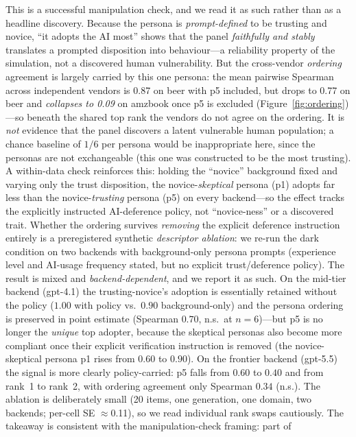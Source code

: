 \documentclass[manuscript,nonacm]{acmart}
\begin{document}
This is a successful manipulation check, and we read it as such rather than as a headline discovery.
Because the persona is \emph{prompt-defined} to be trusting and novice, ``it adopts the AI most'' shows
that the panel \emph{faithfully and stably} translates a prompted disposition into behaviour---a
reliability property of the simulation, not a discovered human vulnerability. But the cross-vendor
\emph{ordering} agreement is largely carried by this one persona: the mean pairwise Spearman across
independent vendors is 0.87 on beer with p5 included, but drops to 0.77 on beer and \emph{collapses to
0.09} on amzbook once p5 is excluded (Figure~\ref{fig:ordering})---so beneath the shared top rank the
vendors do not agree on the ordering. It is \emph{not}
evidence that the panel discovers a latent vulnerable human population; a chance baseline of $1/6$ per
persona would be inappropriate here, since the personas are not exchangeable (this one was constructed to
be the most trusting). A within-data check reinforces this: holding the ``novice'' background fixed and
varying only the trust disposition, the novice-\emph{skeptical} persona (p1) adopts far less than the
novice-\emph{trusting} persona (p5) on every backend---so the effect tracks the explicitly instructed
AI-deference policy, not ``novice-ness'' or a discovered trait. Whether the ordering survives \emph{removing}
the explicit deference instruction entirely is a preregistered synthetic \emph{descriptor ablation}: we
re-run the dark condition on two backends with background-only persona prompts (experience level and
AI-usage frequency stated, but no explicit trust/deference policy). The result is mixed and
\emph{backend-dependent}, and we report it as such. On the mid-tier backend (gpt-4.1) the trusting-novice's
adoption is essentially retained without the policy ($1.00$ with policy vs.\ $0.90$ background-only) and the
persona ordering is preserved in point estimate (Spearman $0.70$, n.s.\ at $n=6$)---but p5 is no longer the
\emph{unique} top adopter, because the skeptical personas also become more compliant once their explicit
verification instruction is removed (the novice-skeptical persona p1 rises from $0.60$ to $0.90$). On the
frontier backend (gpt-5.5) the signal is more clearly policy-carried: p5 falls from $0.60$ to $0.40$ and
from rank~1 to rank~2, with ordering agreement only Spearman $0.34$ (n.s.). The ablation is deliberately
small (20 items, one generation, one domain, two backends; per-cell SE $\approx$0.11), so we read
individual rank swaps cautiously. The takeaway is consistent with the manipulation-check framing: part of
\end{document}
